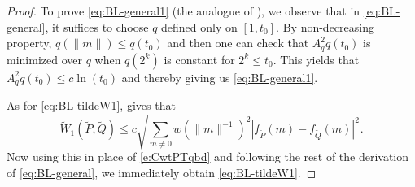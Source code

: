 \documentclass[12pt]{article}
\newcommand{\1}{\mathbf{1}}
\begin{document}
{{{{{\begin{proof}
{To prove \eqref{eq:BL-general1} (the analogue of \cite[(7)]{bobkov2024correction}), we observe that in \eqref{eq:BL-general}, it suffices to choose $q$ defined only on $[1,t_0]$. By non-decreasing property, $q(\|m\|)  \leqslant q(t_0)$ and then one can check that $A_q^2q(t_0)$ is minimized over $q$ when $q(2^k)$ is constant for $2^k  \leqslant t_0$. This yields that $A_q^2q(t_0) \leqslant  c \ln(t_0)$  and thereby giving us \eqref{eq:BL-general1}.}

{As for \eqref{eq:BL-tildeW1}, \cite[Lemma 1]{bobkov2021simple} gives that
%
$$ \tilde{W}_1(\tilde P ,\tilde Q )\leqslant c \sqrt{\sum_{m\neq 0} w(\|m\|^{-1} )^{2} | f_{ \tilde 	P }(m)-f_{ \tilde 	Q }(m) | ^{2}}.$$
%
Now using this in place of \eqref{e:CwtPTqbd} and following the rest of the derivation of \eqref{eq:BL-general}, we immediately obtain \eqref{eq:BL-tildeW1}.}


\end{proof}}}}}}
\end{document}
